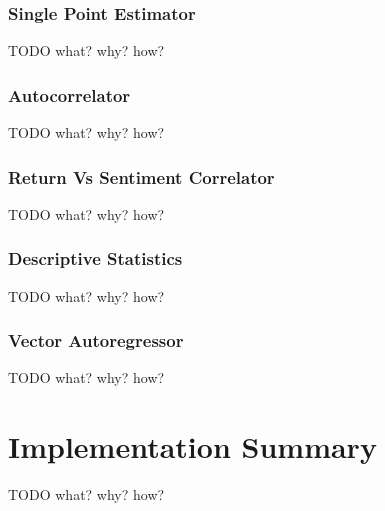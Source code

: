 \subsubsection{Single Point Estimator}
TODO what? why? how?

\subsubsection{Autocorrelator}
TODO what? why? how?

\subsubsection{Return Vs Sentiment Correlator}
TODO what? why? how?

\subsubsection{Descriptive Statistics}
TODO what? why? how?

\subsubsection{Vector Autoregressor}
TODO what? why? how?

\section{Implementation Summary}
TODO what? why? how?